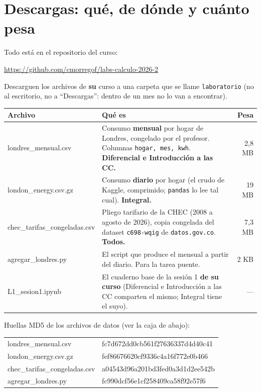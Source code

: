 \documentclass[12pt,letterpaper]{article}
\newcommand{\REPO}{\url{https://github.com/cmorregof/labs-calculo-2026-2}}
\begin{document}
\section{Descargas: qué, de dónde y cuánto pesa}
Todo está en el repositorio del curso:
\begin{center}\REPO\end{center}
Descarguen los archivos de \textbf{su} curso a una carpeta que se llame \texttt{laboratorio} (no al escritorio, no a ``Descargas'': dentro de un mes no lo van a encontrar).

\begin{center}
\small
\begin{tabularx}{\textwidth}{>{\ttfamily}l X r}
\toprule
\textrm{\textbf{Archivo}} & \textbf{Qué es} & \textbf{Pesa}\\
\midrule
londres\_mensual.csv & Consumo \textbf{mensual} por hogar de Londres, congelado por el profesor. Columnas \texttt{hogar, mes, kwh}. \textbf{Diferencial e Introducción a las CC.} & 2,8 MB\\
london\_energy.csv.gz & Consumo \textbf{diario} por hogar (el crudo de Kaggle, comprimido; \texttt{pandas} lo lee tal cual). \textbf{Integral.} & 19 MB\\
chec\_tarifas\_congeladas.csv & Pliego tarifario de la CHEC (2008 a agosto de 2026), copia congelada del dataset \texttt{c698-wqig} de \texttt{datos.gov.co}. \textbf{Todos.} & 7,3 MB\\
agregar\_londres.py & El script que produce el mensual a partir del diario. Para la tarea puente. & 2 KB\\
L1\_sesion1.ipynb & El cuaderno base de la sesión 1 \textbf{de su curso} (Diferencial e Introducción a las CC comparten el mismo; Integral tiene el suyo). & ---\\
\bottomrule
\end{tabularx}
\end{center}

Huellas MD5 de los archivos de datos (ver la caja de abajo):
\begin{center}
\small\ttfamily
\begin{tabular}{ll}
londres\_mensual.csv & fc7d672dd0cb561f27636337d4d40c41\\
london\_energy.csv.gz & fef86676620cf9336c4a16f772e0b466\\
chec\_tarifas\_congeladas.csv & a04543d96a201bd3fed0a3d1d2ee542b\\
agregar\_londres.py & fc990dcf56e1cf258409ca58f92e57f6\\
\end{tabular}
\end{center}
\end{document}
